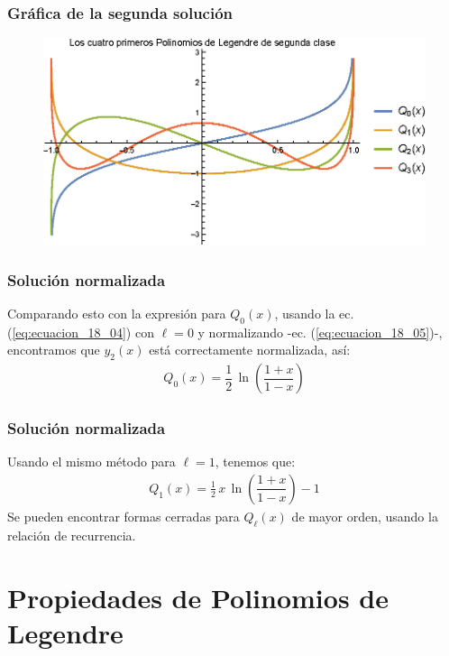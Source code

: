 \documentclass[12pt]{beamer}
\begin{document}
\begin{frame}
\frametitle{Gráfica de la segunda solución}
\begin{figure}[H]
    \centering
    \includegraphics[scale=0.9]{Imagenes/Plot_LagrangeSC_0-4.eps}
\end{figure}
\end{frame}
\begin{frame}
\frametitle{Solución normalizada}
Comparando esto con la expresión para $Q_{0} (x)$, usando la ec. (\ref{eq:ecuacion_18_04}) con $\ell = 0$ y normalizando -ec. (\ref{eq:ecuacion_18_05})-, encontramos que $y_{2} (x)$ está correctamente normalizada, así:
\pause
\begin{align*}
Q_{0} (x) = \dfrac{1}{2} \, \ln \left( \dfrac{1 + x}{1 - x} \right)
\end{align*}
\end{frame}
\begin{frame}
\frametitle{Solución normalizada}
Usando el mismo método para $\ell = 1$, tenemos que:
\pause
\begin{align*}
Q_{1} (x) =  \frac{1}{2} \, x \,  \ln \left( \dfrac{1 + x}{1 - x} \right) - 1
\end{align*}
Se pueden encontrar formas cerradas para $Q_{\ell} (x)$ de mayor orden, usando la relación de recurrencia.
\end{frame}

\section{Propiedades de Polinomios de Legendre}
\end{document}
